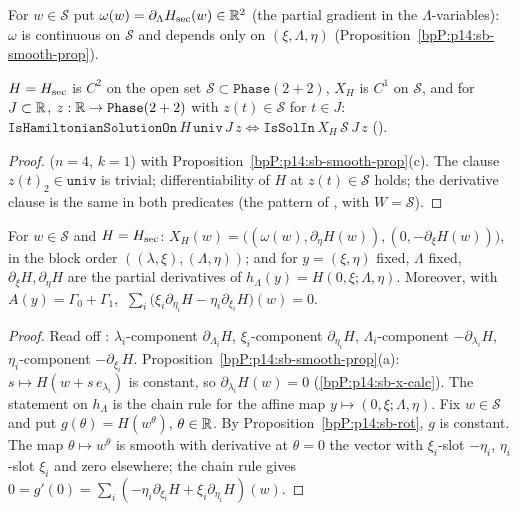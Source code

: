 For $w\in\mathcal S$ put $\omega(w)=\partial_{\Lambda}H_{\rm sec}(w)\in\mathbb{R}^2$ (the partial gradient in the $\Lambda$-variables): $\omega$ is continuous on $\mathcal S$ and depends only on $(\xi,\Lambda,\eta)$ (Proposition~\ref{bpP:p14:sb-smooth-prop}).

\begin{lemma}\label{bpP:p14:sb-pred}
$H=H_{\rm sec}$ is $C^2$ on the open set $\mathcal S\subset\texttt{Phase}(2+2)$, $X_H$ is $C^1$ on $\mathcal S$, and for $J\subset\mathbb{R}$, $z:\mathbb{R}\to\texttt{Phase}(2+2)$ with $z(t)\in\mathcal S$ for $t\in J$:
$\texttt{IsHamiltonianSolutionOn}\,H\,\texttt{univ}\,J\,z\iff\texttt{IsSolIn}\,X_H\,\mathcal S\,J\,z$ ().
\end{lemma}
\begin{proof}
\label{stepP:p14:sb-pr-1}  ($n=4$, $k=1$) with Proposition~\ref{bpP:p14:sb-smooth-prop}(c).
\label{stepP:p14:sb-pr-2} The clause $z(t)_2\in\texttt{univ}$ is trivial; differentiability of $H$ at $z(t)\in\mathcal S$ holds; the derivative clause is the same in both predicates (the pattern of , with $W=\mathcal S$).
\end{proof}

\begin{lemma}[Structure of $X_H$]\label{bpP:p14:sb-field}
For $w\in\mathcal S$ and $H=H_{\rm sec}$: $X_H(w)=\bigl((\omega(w),\partial_\eta H(w)),(0,-\partial_\xi H(w))\bigr)$, in the block order $((\lambda,\xi),(\Lambda,\eta))$; and for $y=(\xi,\eta)$ fixed, $\Lambda$ fixed, $\partial_\xi H,\partial_\eta H$ are the partial derivatives of $h_\Lambda(y)=H(0,\xi;\Lambda,\eta)$.
Moreover, with $A(y)=\Gamma_0+\Gamma_1$, $\ \sum_i\bigl(\xi_i\partial_{\eta_i}H-\eta_i\partial_{\xi_i}H\bigr)(w)=0$.
\end{lemma}
\begin{proof}
\label{stepP:p14:sb-fd-1} Read off : $\lambda_i$-component $\partial_{\Lambda_i}H$, $\xi_i$-component $\partial_{\eta_i}H$, $\Lambda_i$-component $-\partial_{\lambda_i}H$, $\eta_i$-component $-\partial_{\xi_i}H$. Proposition~\ref{bpP:p14:sb-smooth-prop}(a): $s\mapsto H(w+s\,e_{\lambda_i})$ is constant, so $\partial_{\lambda_i}H(w)=0$ (\ref{bpP:p14:sb-x-calc}). The statement on $h_\Lambda$ is the chain rule for the affine map $y\mapsto(0,\xi;\Lambda,\eta)$.
\label{stepP:p14:sb-fd-2} Fix $w\in\mathcal S$ and put $g(\theta)=H(w^\theta)$, $\theta\in\mathbb{R}$. By Proposition~\ref{bpP:p14:sb-rot}, $g$ is constant. The map $\theta\mapsto w^\theta$ is smooth with derivative at $\theta=0$ the vector with $\xi_i$-slot $-\eta_i$, $\eta_i$-slot $\xi_i$ and zero elsewhere; the chain rule gives $0=g'(0)=\sum_i(-\eta_i\partial_{\xi_i}H+\xi_i\partial_{\eta_i}H)(w)$.
\end{proof}

